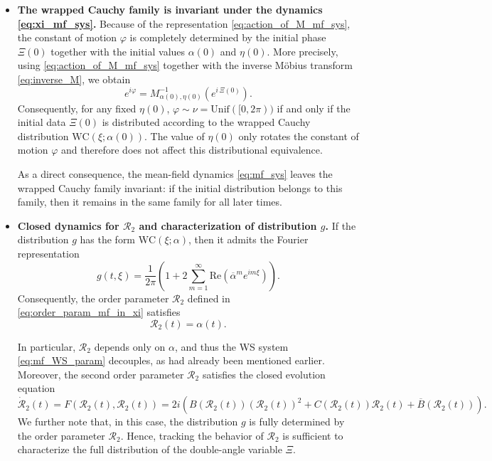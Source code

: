 \documentclass[10pt]{article}
\theoremstyle{definition}
\theoremstyle{definition}
\numberwithin{equation}{section}
\newcommand{\CR}{\mathcal{R}}
\newcommand{\re}[1]{\mathrm{Re}\left(#1\right)}
\newcommand{\alphaBar}{\overline{\alpha}}
\newcommand{\WC}{\mathrm{WC}}
\begin{document}
\begin{itemize}
    \item \textbf{The wrapped Cauchy family is invariant under the dynamics \eqref{eq:xi_mf_sys}.} 
    Because of the representation \eqref{eq:action_of_M_mf_sys}, the constant of motion $\varphi$ is completely determined by the initial phase $\Xi(0)$ together with the initial values $\alpha(0)$ and $\eta(0)$.
    More precisely, using \eqref{eq:action_of_M_mf_sys} together with the inverse Möbius transform \eqref{eq:inverse_M}, we obtain
    \begin{equation*}
    e^{i\varphi} = M_{\alpha(0), \eta(0)}^{-1} \left( e^{i \,\Xi(0)} \right) .
    \end{equation*}
   Consequently, for any fixed $\eta(0)$, $\varphi \sim \nu =   \mathrm{Unif}([0,2\pi))$ if and only if the initial data $\Xi(0)$ is distributed according to the wrapped Cauchy distribution $\WC(\xi; \alpha(0))$. 
    The value of $\eta(0)$ only rotates the constant of motion $\varphi$ and therefore does not affect this distributional equivalence.
   

    As a direct consequence, the mean-field dynamics \eqref{eq:mf_sys} leaves the wrapped Cauchy family invariant: if the initial distribution belongs to this family, then it remains in the same family for all later times.
    

    \item \textbf{Closed dynamics for $\CR_2$ and characterization of distribution $g$.} 
    If the distribution $g$ has the form $\WC(\xi; \alpha)$, then it admits the Fourier representation
    \begin{equation*}
    g(t, \xi) = \frac{1}{2\pi} \left(1 + 2\sum_{m=1}^{\infty} \re{\alphaBar^m e^{im \xi}} \right).
    \end{equation*}
    Consequently, the order parameter $\CR_2$ defined in \eqref{eq:order_param_mf_in_xi} satisfies
    \begin{equation}
       \CR_2 (t) = \alpha(t).
    \end{equation}

    In particular, $\CR_2$ depends only on $\alpha$, and thus the WS system \eqref{eq:mf_WS_param} decouples, as had already been mentioned earlier. Moreover, the second order parameter $\CR_2$ satisfies the closed evolution equation
    \begin{equation}\label{eq:dyn_r2}
    \Dot{\CR}_2(t) = F(\CR_2(t), \CR_2(t))
    = 2i \left( B(\CR_2(t)) (\CR_2(t))^2 + C(\CR_2(t)) \CR_2(t) + \overline{B}(\CR_2(t)) \right) .
    \end{equation}
    We further note that, in this case, the distribution $g$ is fully determined by the order parameter $\CR_2$. 
    Hence, tracking the behavior of $\CR_2$ is sufficient to characterize the full distribution of the double-angle variable $\Xi$.
\end{itemize}
\end{document}
